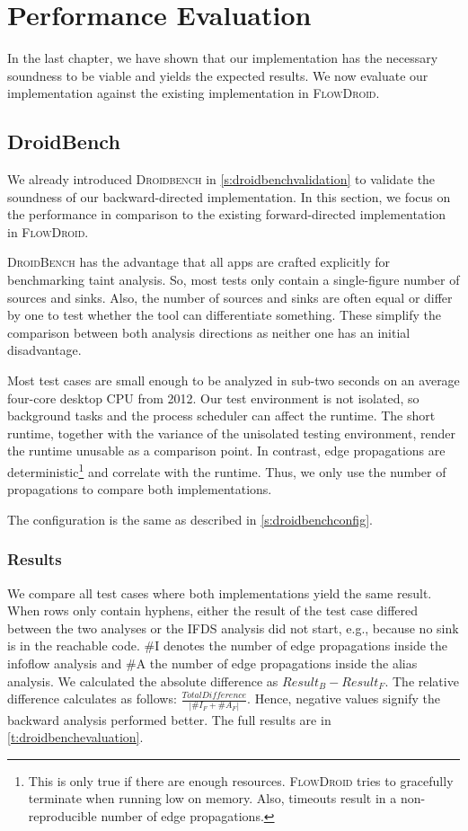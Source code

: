 \documentclass[../draft.tex]{subfiles}
\begin{document}
    \chapter{Performance Evaluation}
    In the last chapter, we have shown that our implementation has the necessary soundness to be viable and yields the expected results. 
    We now evaluate our implementation against the existing implementation in \textsc{FlowDroid}.
    
    \section{DroidBench}
    We already introduced \textsc{Droidbench} in \autoref{s:droidbenchvalidation} to validate the soundness of our backward-directed implementation. In this section, we focus on the performance in comparison to the existing forward-directed implementation in \textsc{FlowDroid}. 

    \textsc{DroidBench} has the advantage that all apps are crafted explicitly for benchmarking taint analysis. So, most tests only contain a single-figure number of sources and sinks. Also, the number of sources and sinks are often equal or differ by one to test whether the tool can differentiate something. These simplify the comparison between both analysis directions as neither one has an initial disadvantage.

    Most test cases are small enough to be analyzed in sub-two seconds on an average four-core desktop CPU from 2012. Our test environment is not isolated, so background tasks and the process scheduler can affect the runtime. The short runtime, together with the variance of the unisolated testing environment, render the runtime unusable as a comparison point. In contrast, edge propagations are deterministic\footnote{This is only true if there are enough resources. \textsc{FlowDroid} tries to gracefully terminate when running low on memory. Also, timeouts result in a non-reproducible number of edge propagations.} and correlate with the runtime. Thus, we only use the number of propagations to compare both implementations.

    The configuration is the same as described in \autoref{s:droidbenchconfig}.

    \subsection{Results}
    We compare all test cases where both implementations yield the same result. When rows only contain hyphens, either the result of the test case differed between the two analyses or the IFDS analysis did not start, e.g., because no sink is in the reachable code. \#I denotes the number of edge propagations inside the infoflow analysis and \#A the number of edge propagations inside the alias analysis. We calculated the absolute difference as $\mathit{Result}_{\mathit{B}} - \mathit{Result}_{\mathit{F}}$. The relative difference calculates as follows: $\frac{\mathit{TotalDifference}}{|\mathit{\#I_\mathit{F} + \#A_\mathit{F}}|}$. Hence, negative values signify the backward analysis performed better. The full results are in \autoref{t:droidbenchevaluation}.
\end{document}
